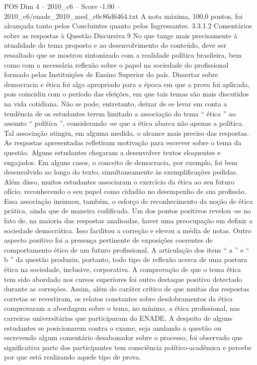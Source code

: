 \begin{textsample}{POS Dim 4 – 2010\_c6 – Score -1.00 – 2010\_c6/enade\_2010\_med\_c0c86d6464.txt}
A nota máxima, 100,0 pontos, foi alcançada tanto pelos Concluintes quanto pelos Ingressantes. 3.3.1.2 Comentários sobre as respostas à Questão Discursiva 9 No que tange mais precisamente à atualidade do tema proposto e ao desenvolvimento do conteúdo, deve ser ressaltado que se mostrou sintonizado com a realidade política brasileira, bem como com a necessária reflexão sobre o papel na sociedade do profissional formado pelas Instituições de Ensino Superior do país.
Dissertar sobre democracia e ética foi algo apropriado para a época em que a prova foi aplicada, pois coincidiu com o período das eleições, em que tais temas são mais discutidos na vida cotidiana.
Não se pode, entretanto, deixar de se levar em conta a tendência de os estudantes terem limitado a associação do tema “ ética ” ao assunto “ política ”, considerando -se que a ética abarca não apenas a política.
Tal associação atingiu, em alguma medida, o alcance mais preciso das respostas.
As respostas apresentadas refletiram motivação para escrever sobre o tema da questão.
Alguns estudantes chegaram a desenvolver textos eloquentes e engajados.
Em alguns casos, o conceito de democracia, por exemplo, foi bem desenvolvido ao longo do texto, simultaneamente às exemplificações pedidas.
Além disso, muitos estudantes associaram o exercício da ética ao seu futuro ofício, reconhecendo o seu papel como cidadão no desempenho de sua profissão.
Essa associação insinuou, também, o esforço de reconhecimento da noção de ética prática, ainda que de maneira codificada.
Um dos pontos positivos revelou -se no fato de, na maioria das respostas analisadas, haver uma preocupação em definir a sociedade democrática.
Isso facilitou a correção e elevou a média de notas.
Outro aspecto positivo foi a presença pertinente de exposições coerentes de comportamento ético de um futuro profissional.
A articulação dos itens “ a ” e “ b ” da questão produziu, portanto, todo tipo de reflexão acerca de uma postura ética na sociedade, inclusive, corporativa.
A comprovação de que o tema ética tem sido abordado nos cursos superiores foi outro destaque positivo detectado durante as correções.
Assim, além do caráter crítico de que muitas das respostas corretas se revestiram, os relatos constantes sobre desdobramentos da ética comprovaram a abordagem sobre o tema, no mínimo, a ética profissional, nas carreiras universitárias que participaram do ENADE.
A despeito de alguns estudantes se posicionarem contra o exame, seja anulando a questão ou escrevendo algum comentário desabonador sobre o processo, foi observado que significativa parte dos participantes tem consciência político-acadêmica e percebe por que está realizando aquele tipo de prova.

\end{textsample}
